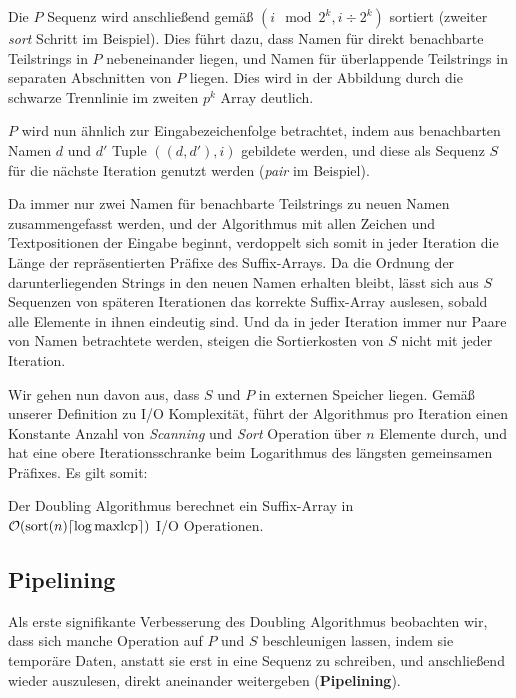 Die $P$ Sequenz wird anschließend gemäß $(i \mod 2^k, i \div 2^k)$ sortiert (zweiter \textit{sort} Schritt im Beispiel). Dies führt dazu, dass Namen für direkt benachbarte Teilstrings in $P$ nebeneinander liegen, und Namen für überlappende Teilstrings in separaten Abschnitten von $P$ liegen. Dies wird in der Abbildung durch die schwarze Trennlinie im zweiten $p^k$ Array deutlich.

$P$ wird nun ähnlich zur Eingabezeichenfolge betrachtet, indem aus benachbarten Namen $d$ und $d'$ Tuple $((d, d'), i)$ gebildete werden, und diese als Sequenz $S$ für die nächste Iteration genutzt werden (\textit{pair} im Beispiel).

Da immer nur zwei Namen für benachbarte Teilstrings zu neuen Namen zusammengefasst werden, und der Algorithmus mit allen Zeichen und Textpositionen der Eingabe beginnt, verdoppelt sich somit in jeder Iteration die Länge der repräsentierten Präfixe des Suffix-Arrays. Da die Ordnung der darunterliegenden Strings in den neuen Namen erhalten bleibt, lässt sich aus $S$ Sequenzen von späteren Iterationen das korrekte Suffix-Array auslesen, sobald alle Elemente in ihnen eindeutig sind. Und da in jeder Iteration immer nur Paare von Namen betrachtete werden, steigen die Sortierkosten von $S$ nicht mit jeder Iteration.

Wir gehen nun davon aus, dass $S$ und $P$ in externen Speicher liegen.  Gemäß unserer Definition zu I/O Komplexität, führt der Algorithmus pro Iteration einen Konstante Anzahl von \textit{Scanning} und \textit{Sort} Operation über $n$ Elemente durch, und hat eine obere Iterationsschranke beim Logarithmus des längsten gemeinsamen Präfixes. Es gilt somit:

\begin{theorem}
Der Doubling Algorithmus berechnet ein Suffix-Array in\\ $\mathcal{O}(\text{sort}(n) \ceil*{\log \text{maxlcp}})$ I/O Operationen.
\end{theorem}

\subsection{Pipelining}
\label{algo:doubling:sec:pipelining}

Als erste signifikante Verbesserung des Doubling Algorithmus beobachten wir, dass sich manche Operation auf $P$ und $S$ beschleunigen lassen, indem sie temporäre Daten, anstatt sie erst in eine Sequenz zu schreiben, und anschließend wieder auszulesen, direkt aneinander weitergeben (\textbf{Pipelining}). 

